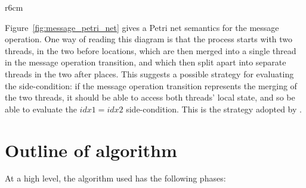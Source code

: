\begin{wrapfigure}{r}{6cm}
  \vspace{-17pt}
  \caption{Petri net for the message operation.}
  \label{fig:message_petri_net}
  \vspace{-20pt}
\end{wrapfigure}
Figure~\ref{fig:message_petri_net} gives a Petri net semantics for the
message operation.  One way of reading this diagram is that the
process starts with two threads, in the two before locations, which
are then merged into a single thread in the message operation
transition, and which then split apart into separate threads in the
two after places.  This suggests a possible strategy for evaluating
the side-condition: if the message operation transition represents the
merging of the two threads, it should be able to access both threads'
local state, and so be able to evaluate the $\mathit{idx1} =
\mathit{idx2}$ side-condition.  This is the strategy adopted by
       {\technique}.

\section{Outline of algorithm}

At a high level, the algorithm used has the following phases:

